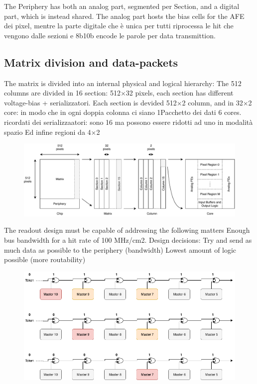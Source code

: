     The Periphery has both an analog part, segmented per Section, and a digital part, which is instead shared. The analog part hosts the bias cells for the AFE dei pixel, mentre la parte digitale che è unica per tutti riprocessa le hit che vengono dalle sezioni e 8b10b encode le parole per data transmittion.  
    
    
    \subsection{Matrix division and data-packets}
        The matrix is divided into an internal physical and logical hierarchy:
        The 512 columns are divided in 16 section: 512$\times$32 pixels, each section has different voltage-bias + serializzatori.
        Each section is devided 512$\times$2 column, and in 32$\times$2 core: in modo che in ogni doppia colonna ci siano 1Pacchetto dei dati  6 cores. ricordati dei serializzaatori: sono 16 ma possono essere ridotti ad uno in modalità spazio
        Ed infine regioni da 4$\times$2
        \begin{figure}[h!]
            \centering
            \includegraphics[width=.95\linewidth]{figures/ARCADIA/hierarchy.pdf}
            \caption{}
            \label{fig:hierarchy}
        \end{figure}
        The readout design must be capable of addressing the following matters Enough bus bandwidth for a hit rate of 100 MHz/cm2. Design decisions: Try and send as much data as possible to the periphery (bandwidth)
        Lowest amount of logic possible (more routability)
        
        \begin{figure}[h!]
            \centering
            \includegraphics[width=.95\linewidth]{figures/ARCADIA/token_chain.png}
            \caption{}
            \label{fig:token_chain}
        \end{figure}


